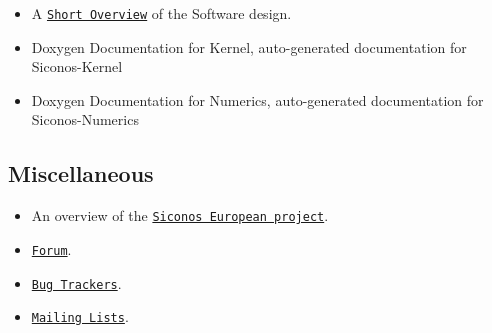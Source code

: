 \begin{itemize}
\item A \href{http://siconos.gforge.inria.fr/Documentation/SiconosOverview/CapriSept2006.pdf}{\tt Short Overview} of the Software design.\end{itemize}


\begin{itemize}
\item Doxygen Documentation for Kernel, auto-generated documentation for Siconos-Kernel\end{itemize}


\begin{itemize}
\item Doxygen Documentation for Numerics, auto-generated documentation for Siconos-Numerics\end{itemize}
\hypertarget{SiconosDocList_miscDoc}{}\subsection{Miscellaneous}\label{SiconosDocList_miscDoc}
\begin{itemize}
\item An overview of the \href{http://siconos.gforge.inria.fr/docDev/index.html}{\tt Siconos European project}.\end{itemize}


\begin{itemize}
\item \href{https://gforge.inria.fr/forum/?group_id=9}{\tt Forum}.\end{itemize}


\begin{itemize}
\item \href{https://gforge.inria.fr/tracker/?group_id=9}{\tt Bug Trackers}.\end{itemize}


\begin{itemize}
\item \href{https://gforge.inria.fr/mail/?group_id=9}{\tt Mailing Lists}. \end{itemize}

